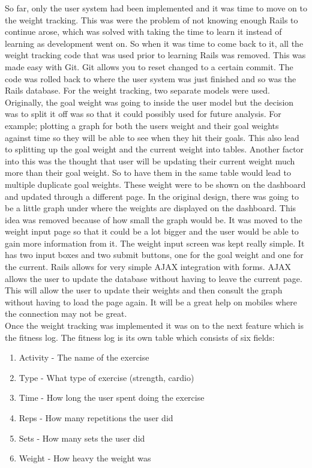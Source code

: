So far, only the user system had been implemented and it was time to move on to the weight tracking. This was were the problem of not knowing enough Rails to continue arose, which was solved with taking the time to learn it instead of learning as development went on. So when it was time to come back to it, all the weight tracking code that was used prior to learning Rails was removed. This was made easy with Git. Git allows you to reset changed to a certain commit. The code was rolled back to where the user system was just finished and so was the Rails database. For the weight tracking, two separate models were used. Originally, the goal weight was going to inside the user model but the decision was to split it off was so that it could possibly used for future analysis. For example; plotting a graph for both the users weight and their goal weights against time so they will be able to see when they hit their goals. This also lead to splitting up the goal weight and the current weight into tables. Another factor into this was the thought that user will be updating their current weight much more than their goal weight. So to have them in the same table would lead to multiple duplicate goal weights. These weight were to be shown on the dashboard and updated through a different page. In the original design, there was going to be a little graph under where the weights are displayed on the dashboard. This idea was removed because of how small the graph would be. It was moved to the weight input page so that it could be a lot bigger and the user would be able to gain more information from it. The weight input screen was kept really simple. It has two input boxes and two submit buttons, one for the goal weight and one for the current. Rails allows for very simple AJAX integration with forms. AJAX allows the user to update the database without having to leave the current page. This will allow the user to update their weights and then consult the graph without having to load the page again. It will be a great help on mobiles where the connection may not be great.\\

Once the weight tracking was implemented it was on to the next feature which is the fitness log. The fitness log is its own table which consists of six fields:

\begin{enumerate}
\item Activity - The name of the exercise
\item Type - What type of exercise (strength, cardio)
\item Time - How long the user spent doing the exercise
\item Reps - How many repetitions the user did
\item Sets - How many sets the user did
\item Weight - How heavy the weight was
\end{enumerate}

